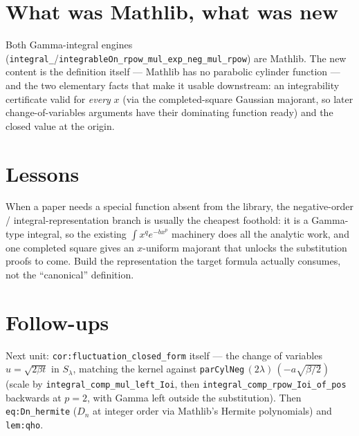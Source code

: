\documentclass[11pt]{article}
\begin{document}
\section{What was Mathlib, what was new}
Both Gamma-integral engines (\texttt{integral\_}/\texttt{integrableOn\_rpow\_mul\_exp\_neg\_mul\_rpow})
are Mathlib. The new content is the definition itself --- Mathlib has no parabolic cylinder function ---
and the two elementary facts that make it usable downstream: an integrability certificate valid for
\emph{every} $x$ (via the completed-square Gaussian majorant, so later change-of-variables arguments
have their dominating function ready) and the closed value at the origin.

\section{Lessons}
When a paper needs a special function absent from the library, the negative-order / integral-representation
branch is usually the cheapest foothold: it is a Gamma-type integral, so the existing
$\int x^q e^{-bx^p}$ machinery does all the analytic work, and one completed square gives an
$x$-uniform majorant that unlocks the substitution proofs to come. Build the representation the target
formula actually consumes, not the ``canonical'' definition.

\section{Follow-ups}
Next unit: \texttt{cor:fluctuation\_closed\_form} itself --- the change of variables $u=\sqrt{2\beta t}$
in $S_\lambda$, matching the kernel against \texttt{parCylNeg}\,$(2\lambda)\,(-a\sqrt{\beta/2})$ (scale
by \texttt{integral\_comp\_mul\_left\_Ioi}, then \texttt{integral\_comp\_rpow\_Ioi\_of\_pos} backwards
at $p=2$, with Gamma left outside the substitution). Then \texttt{eq:Dn\_hermite} ($D_n$ at integer
order via Mathlib's Hermite polynomials) and \texttt{lem:qho}.
\end{document}
